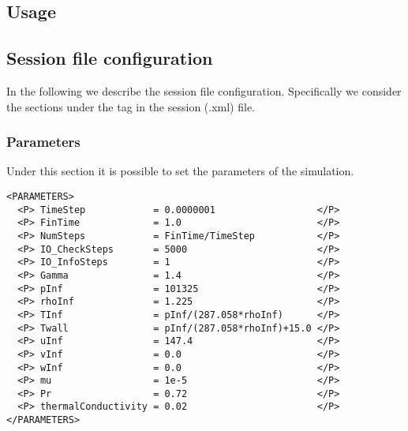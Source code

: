 \subsection{Usage}


\subsection{Session file configuration}
In the following we describe the session file configuration. Specifically we consider the
sections under the tag  in the session (.xml) file.
\subsubsection*{Parameters}
Under this section it is possible to set the parameters of the simulation.
\begin{lstlisting}[style=XmlStyle]
<PARAMETERS>
  <P> TimeStep            = 0.0000001                  </P>
  <P> FinTime             = 1.0                        </P>
  <P> NumSteps            = FinTime/TimeStep           </P>
  <P> IO_CheckSteps       = 5000                       </P>
  <P> IO_InfoSteps        = 1                          </P>
  <P> Gamma               = 1.4                        </P>
  <P> pInf                = 101325                     </P>
  <P> rhoInf              = 1.225                      </P>
  <P> TInf                = pInf/(287.058*rhoInf)      </P>
  <P> Twall               = pInf/(287.058*rhoInf)+15.0 </P>
  <P> uInf                = 147.4                      </P>
  <P> vInf                = 0.0                        </P>
  <P> wInf                = 0.0                        </P>
  <P> mu                  = 1e-5                       </P>
  <P> Pr                  = 0.72                       </P>
  <P> thermalConductivity = 0.02                       </P>
</PARAMETERS>
\end{lstlisting}
